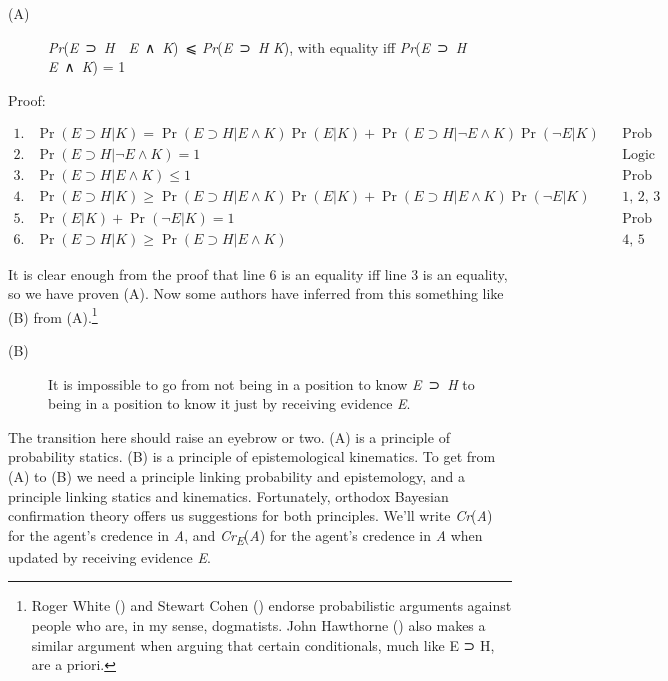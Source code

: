 \documentclass[
  10pt,
  letterpaper,
  DIV=11,
  numbers=noendperiod,
  twoside]{scrartcl}
\begin{document}
\begin{description}
\item[(A)]
\emph{Pr}(\emph{E}~⊃~\emph{H}~\textbar~\emph{E}~∧~\emph{K})~⩽
\emph{Pr}(\emph{E}~⊃~\emph{H} \textbar{} \emph{K}), with equality iff
\emph{Pr}(\emph{E}~⊃~\emph{H} \textbar{} \emph{E}~∧~\emph{K}) = 1
\end{description}

Proof:

\begin{figure*}

\[
\begin{aligned}
1. & \Pr(E \supset H | K) = \Pr(E \supset H | E \wedge K)\Pr(E | K) + \Pr(E \supset H | \neg E \wedge K)\Pr(\neg E | K) &&  \text{Prob theorem} \\
2. & \Pr(E \supset H | \neg E \wedge K) = 1 && \text{Logic} \\
3. & \Pr(E \supset H | E \wedge K) \leq 1  && \text{Prob theorem} \\
4. & \Pr(E \supset H | K)  \geq \Pr(E \supset H | E \wedge K)\Pr(E | K) + \Pr(E \supset H | E \wedge K)\Pr(\neg E | K)  && \text{1, 2, 3} \\
5. & \Pr(E | K) + \Pr(\neg E | K) = 1  && \text{Prob theorem} \\
6. & \Pr(E \supset H | K) \geq \Pr(E \supset H | E \wedge K) && \text{4, 5}
\end{aligned}
\]

\end{figure*}%

It is clear enough from the proof that line 6 is an equality iff line 3
is an equality, so we have proven (A). Now some authors have inferred
from this something like (B) from (A).\footnote{Roger White
  () and Stewart Cohen
  () endorse probabilistic arguments
  against people who are, in my sense, dogmatists. John Hawthorne
  () also makes a similar argument
  when arguing that certain conditionals, much like E ⊃ H, are a priori.}

\begin{description}
\item[(B)]
It is impossible to go from not being in a position to know
\emph{E}~⊃~\emph{H} to being in a position to know it just by receiving
evidence \emph{E}.
\end{description}

The transition here should raise an eyebrow or two. (A) is a principle
of probability statics. (B) is a principle of epistemological
kinematics. To get from (A) to (B) we need a principle linking
probability and epistemology, and a principle linking statics and
kinematics. Fortunately, orthodox Bayesian confirmation theory offers us
suggestions for both principles. We'll write \emph{Cr}(\emph{A}) for the
agent's credence in \emph{A}, and \emph{Cr\textsubscript{E}}(\emph{A})
for the agent's credence in \emph{A} when updated by receiving evidence
\emph{E}.
\end{document}
